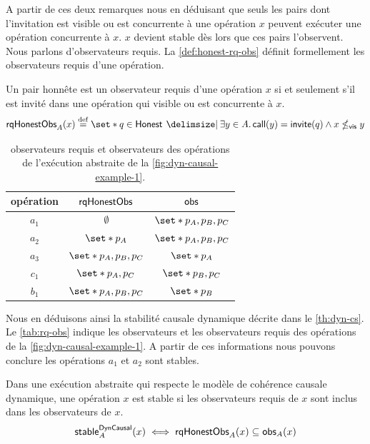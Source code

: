A partir de ces deux remarques nous en déduisant que seuls les pairs dont l'invitation est visible ou est concurrente à une opération $x$ peuvent exécuter une opération concurrente à $x$.
$x$ devient stable dès lors que ces pairs l'observent.
Nous parlons d'observateurs requis.
La \autoref{def:honest-rq-obs} définit formellement les observateurs requis d'une opération.

\begin{definition}\label{def:honest-rq-obs}
Un pair honnête est un observateur requis d'une opération $x$ si et seulement s'il est invité dans une opération qui visible ou est concurrente à $x$.
\begin{equation*}
    \trm{rqHonestObs}_A(x) \defeq \set*{q \in \trm{Honest} \given \exists y \in A \qsep \trm{call}(y) = \trm{invite}(q) \land x \nviseq y}
\end{equation*}
\end{definition}


\begin{table}[htb]
    \centering
    \begin{tabular}{ccc}
        opération & $\operatorname{\mathsf{rqHonestObs}}$ & $\operatorname{\mathsf{obs}}$ \\
        \toprule
        $a_1$ & $\emptyset$ & $\set*{p_A, p_B, p_C}$ \\
        $a_2$ & $\set*{p_A}$ & $\set*{p_A, p_B, p_C}$ \\
        $a_3$ & $\set*{p_A, p_B, p_C}$ & $\set*{p_A}$ \\
        $c_1$ & $\set*{p_A, p_C}$ & $\set*{p_B, p_C}$\\
        $b_1$ & $\set*{p_A, p_B, p_C}$ & $\set*{p_B}$ \\
    \end{tabular}
    \caption[Observateurs requis]{observateurs requis et observateurs des opérations de l'exécution abstraite de la \autoref{fig:dyn-causal-example-1}.}\label{tab:rq-obs}
\end{table}

Nous en déduisons ainsi la stabilité causale dynamique décrite dans le \autoref{th:dyn-cs}.
Le \autoref{tab:rq-obs} indique les observateurs et les observateurs requis des opérations de la \autoref{fig:dyn-causal-example-1}.
A partir de ces informations nous pouvons conclure les opérations $a_1$ et $a_2$ sont stables.

\begin{theorem}\label{th:dyn-cs}
Dans une exécution abstraite qui respecte le modèle de cohérence causale dynamique, une opération $x$ est stable si les observateurs requis de $x$ sont inclus dans les observateurs de $x$.
\begin{equation*}
    \operatorname{\mathsf{stable}}_A^{\operatorname{\mathsf{DynCausal}}}(x) \iff \operatorname{\mathsf{rqHonestObs}}_A(x) \subseteq \operatorname{\mathsf{obs}}_A(x)
\end{equation*}
\end{theorem}

